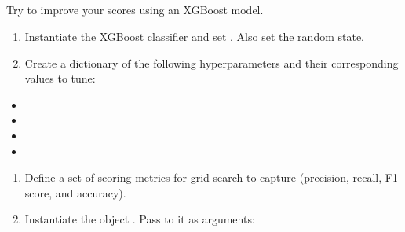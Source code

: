 \documentclass[letterpaper,10pt,english]{sphinxmanual}
\begin{document}
\subsection{}
\label{\detokenize{Automatidata_Machine Learning:xgboost}}
\sphinxAtStartPar
Try to improve your scores using an XGBoost model.
\begin{enumerate}
%
\item {} 
\sphinxAtStartPar
Instantiate the XGBoost classifier  and set . Also set the random state.

\item {} 
\sphinxAtStartPar
Create a dictionary  of the following hyperparameters and their corresponding values to tune:

\end{enumerate}
\begin{itemize}
\item {} 
\sphinxAtStartPar
{}

\item {} 
\sphinxAtStartPar
{}

\item {} 
\sphinxAtStartPar
{}

\item {} 
\sphinxAtStartPar
{}

\end{itemize}
\begin{enumerate}
%
\setcounter{enumi}{2}
\item {} 
\sphinxAtStartPar
Define a set  of scoring metrics for grid search to capture (precision, recall, F1 score, and accuracy).

\item {} 
\sphinxAtStartPar
Instantiate the  object . Pass to it as arguments:

\end{enumerate}
\end{document}
